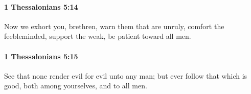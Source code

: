 		\paragraph{1 Thessalonians 5:14} %
			\label{1THESSALONIANS-5-14}

			Now we exhort you, brethren, warn them that are unruly, comfort the feebleminded, support the weak, be patient toward all men.

			\begin{framed}
			\scriptsize
				\begin{compactdesc}
					\item[SBLG] 
				\end{compactdesc}
			\end{framed}

		\paragraph{1 Thessalonians 5:15} %
			\label{1THESSALONIANS-5-15}

			See that none render evil for evil unto any man; but ever follow that which is good, both among yourselves, and to all men.

